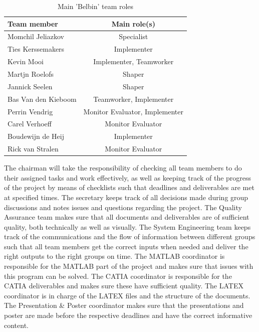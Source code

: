 \documentclass[a4paper]{report}
\begin{document}
\begin{table}[h]
\centering
\caption{Main 'Belbin' team roles}
\label{tab:belbin}
   \begin{tabular}{| l | c | } \hline
   
     \textbf{Team member} & \textbf{Main role(s)}  \\ \hline
     Momchil Jeliazkov & Specialist  \\ \hline
     Ties Kerssemakers & Implementer  \\ \hline
     Kevin Mooi & Implementer, Teamworker  \\ \hline
     Martjn Roelofs & Shaper  \\ \hline
     Jannick Seelen & Shaper  \\ \hline
     Bas Van den Kieboom & Teamworker, Implementer  \\ \hline
     Perrin Vendrig & Monitor Evaluator, Implementer  \\ \hline
     Carel Verhoeff & Monitor Evaluator  \\ \hline
     Boudewijn de Heij & Implementer  \\ \hline
     Rick van Stralen & Monitor Evaluator \\ \hline
    
     \end{tabular}
\end{table}

The chairman will take the responsibility of checking all team members to do their assigned tasks and work effectively, as well as keeping track of the progress of the project by means of checklists such that deadlines and deliverables are met at specified times. The secretary keeps track of all decisions made during group discussions and notes issues and questions regarding the project. The Quality Assurance team makes sure that all documents and deliverables are of sufficient quality, both technically as well as visually. The System Engineering team keeps track of the communications and the flow of information between different groups such that all team members get the correct inputs when needed and deliver the right outputs to the right groups on time. The MATLAB coordinator is responsible for the MATLAB part of the project and makes sure that issues with this program can be solved. The CATIA coordinator is responsible for the CATIA deliverables and makes sure these have sufficient quality. The LATEX coordinator is in charge of the LATEX files and the structure of the documents. The Presentation \& Poster coordinator makes sure that the presentations and poster are made before the respective deadlines and have the correct informative content.\\
\end{document}
